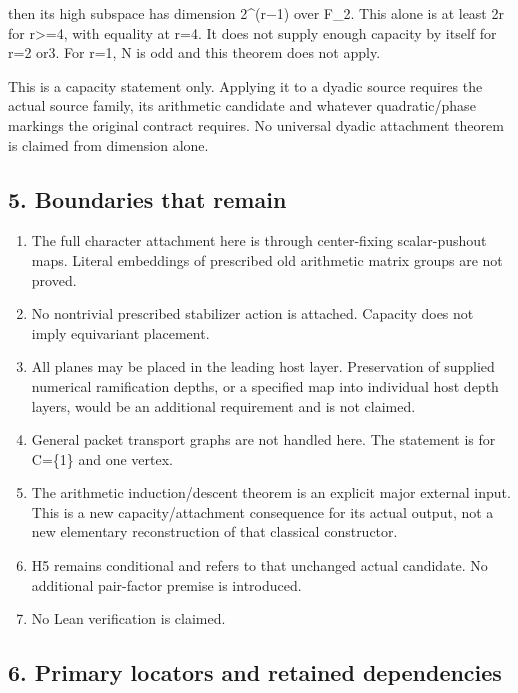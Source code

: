 then its high subspace has dimension 2\^{}(r−1) over F\_2. This alone is
at least 2r for r\textgreater=4, with equality at r=4. It does not
supply enough capacity by itself for r=2 or3. For r=1, N is odd and this
theorem does not apply.

This is a capacity statement only. Applying it to a dyadic source
requires the actual source family, its arithmetic candidate and whatever
quadratic/phase markings the original contract requires. No universal
dyadic attachment theorem is claimed from dimension alone.

\hypertarget{odd_capacity-boundaries-that-remain}{%
\subsection{5. Boundaries that remain}\label{odd_capacity-boundaries-that-remain}}

\begin{enumerate}
\def\labelenumi{\arabic{enumi}.}
\tightlist
\item
  The full character attachment here is through center-fixing
  scalar-pushout maps. Literal embeddings of prescribed old arithmetic
  matrix groups are not proved.
\item
  No nontrivial prescribed stabilizer action is attached. Capacity does
  not imply equivariant placement.
\item
  All planes may be placed in the leading host layer. Preservation of
  supplied numerical ramification depths, or a specified map into
  individual host depth layers, would be an additional requirement and
  is not claimed.
\item
  General packet transport graphs are not handled here. The statement is
  for C=\{1\} and one vertex.
\item
  The arithmetic induction/descent theorem is an explicit major external
  input. This is a new capacity/attachment consequence for its actual
  output, not a new elementary reconstruction of that classical
  constructor.
\item
  H5 remains conditional and refers to that unchanged actual candidate.
  No additional pair-factor premise is introduced.
\item
  No Lean verification is claimed.
\end{enumerate}

\hypertarget{odd_capacity-primary-locators-and-retained-dependencies}{%
\subsection{6. Primary locators and retained
dependencies}\label{odd_capacity-primary-locators-and-retained-dependencies}}

